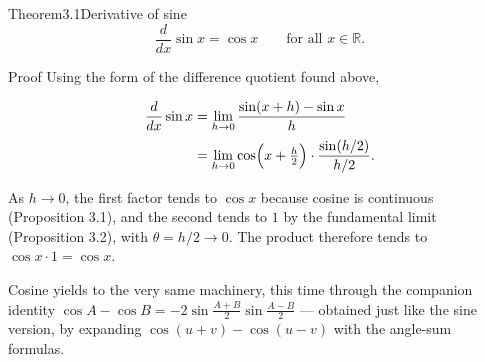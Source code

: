 \begin{hktheorem}{Theorem}{3.1}{Derivative of sine}
\[ \frac{d}{dx}\sin x = \cos x \qquad \text{for all } x \in \mathbb{R}. \]
\end{hktheorem}
\begin{hkproof}{Proof}{}{}
Using the form of the difference quotient found above,

\[ \begin{aligned}
        \frac{d}{dx}\sin x &= \lim_{h \to 0} \frac{\sin(x + h) - \sin x}{h} \\[2pt]
          &= \lim_{h \to 0} \cos\Bigl(x + \tfrac{h}{2}\Bigr) \cdot \frac{\sin(h/2)}{h/2}.
      \end{aligned} \]

As \(h \to 0\), the first factor tends to \(\cos x\) because cosine is continuous (Proposition 3.1), and the second tends to \(1\) by the fundamental limit (Proposition 3.2), with \(\theta = h/2 \to 0\). The product therefore tends to \(\cos x \cdot 1 = \cos x\).
\end{hkproof}
Cosine yields to the very same machinery, this time through the companion identity \(\cos A - \cos B = -2 \sin\frac{A + B}{2} \sin\frac{A - B}{2}\) — obtained just like the sine version, by expanding \(\cos(u + v) - \cos(u - v)\) with the angle-sum formulas.

